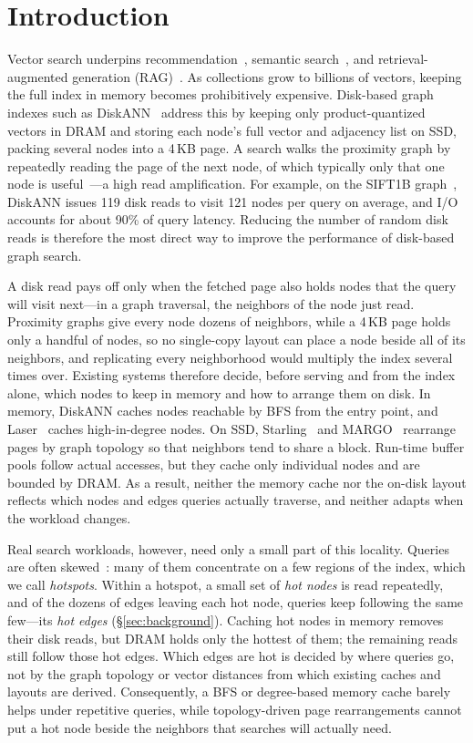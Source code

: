 \section{Introduction}
\label{sec:introduction}

Vector search underpins recommendation~\cite{youtube_dnn}, semantic search~\cite{fb_ebr}, and retrieval-augmented generation (RAG)~\cite{rag}.
As collections grow to billions of vectors, keeping the full index in memory becomes prohibitively expensive.
Disk-based graph indexes such as DiskANN~\cite{diskann} address this by keeping only product-quantized vectors in DRAM and storing each node's full vector and adjacency list on SSD, packing several nodes into a 4\,KB page.
A search walks the proximity graph by repeatedly reading the page of the next node, of which typically only that one node is useful~\cite{starling}---a high read amplification.
For example, on the SIFT1B graph~\cite{bigann}, DiskANN issues 119 disk reads to visit 121 nodes per query on average, and I/O accounts for about 90\% of query latency.
Reducing the number of random disk reads is therefore the most direct way to improve the performance of disk-based graph search.

A disk read pays off only when the fetched page also holds nodes that the query will visit next---in a graph traversal, the neighbors of the node just read.
Proximity graphs give every node dozens of neighbors, while a 4\,KB page holds only a handful of nodes, so no single-copy layout can place a node beside all of its neighbors, and replicating every neighborhood would multiply the index several times over.
Existing systems therefore decide, before serving and from the index alone, which nodes to keep in memory and how to arrange them on disk.
In memory, DiskANN caches nodes reachable by BFS from the entry point, and Laser~\cite{laser} caches high-in-degree nodes.
On SSD, Starling~\cite{starling} and MARGO~\cite{margo} rearrange pages by graph topology so that neighbors tend to share a block.
Run-time buffer pools follow actual accesses, but they cache only individual nodes and are bounded by DRAM.
As a result, neither the memory cache nor the on-disk layout reflects which nodes and edges queries actually traverse, and neither adapts when the workload changes.

Real search workloads, however, need only a small part of this locality.
Queries are often skewed~\cite{quake,ragcache,xie_locality_2002}: many of them concentrate on a few regions of the index, which we call \emph{hotspots}.
Within a hotspot, a small set of \emph{hot nodes} is read repeatedly, and of the dozens of edges leaving each hot node, queries keep following the same few---its \emph{hot edges} (\S\ref{sec:background}).
Caching hot nodes in memory removes their disk reads, but DRAM holds only the hottest of them; the remaining reads still follow those hot edges.
Which edges are hot is decided by where queries go, not by the graph topology or vector distances from which existing caches and layouts are derived.
Consequently, a BFS or degree-based memory cache barely helps under repetitive queries, while topology-driven page rearrangements cannot put a hot node beside the neighbors that searches will actually need.

